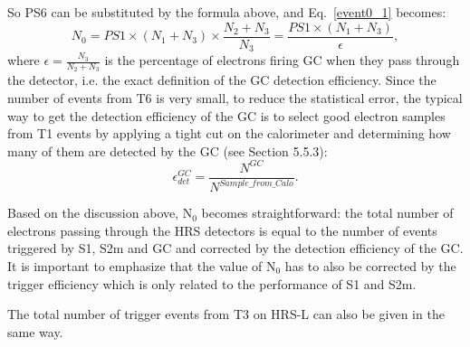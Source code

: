  So PS6 can be substituted by the formula above, and Eq.~\ref{event0_1} becomes:
\begin{equation}
 N_{0} = PS1\times(N_{1}+N_{3})\times \frac{N_{2}+N_{3}}{N_{3}}=\frac{PS1\times(N_{1}+N_{3})}{\epsilon},
\label{event0_2}
\end{equation}
where $\epsilon=\frac{N_{3}}{N_{2}+N_{3}}$ is the percentage of electrons firing GC when they pass through the detector, i.e. the exact definition of the GC detection efficiency. Since the number of events from T6 is very small, to reduce the statistical error, the typical way to get the detection efficiency of the GC is to select good electron samples from T1 events by applying a tight cut on the calorimeter and determining how many of them are detected by the GC (see Section 5.5.3): 
\begin{equation}
 \epsilon_{det}^{GC}=\frac{N^{GC}}{N^{Sample\_from\_Calo}}.
\end{equation}

 Based on the discussion above, $\mathrm{N_{0}}$ becomes straightforward: the total number of electrons passing through the HRS detectors is equal to the number of events triggered by S1, S2m and GC and corrected by the detection efficiency of the GC. It is important to emphasize that the value of $\mathrm{N_{0}}$ has to also be corrected by the trigger efficiency which is only related to the performance of S1 and S2m.
 
 The total number of trigger events from T3 on HRS-L can also be given in the same way.